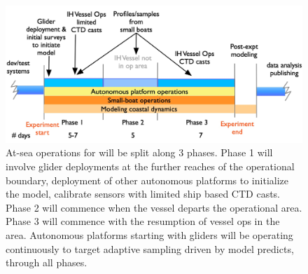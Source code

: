 \begin{figure}[!t]
  \vspace{-0.5cm}
  \centering
  \includegraphics[scale=0.25]{fig/timelines.jpg}
  \caption{At-sea operations for \proj will be split along 3 phases.
    Phase 1 will involve glider deployments at the further reaches of
    the operational boundary, deployment of other autonomous platforms
    to initialize the model, calibrate sensors with limited ship based
    CTD casts. Phase 2 will commence when the vessel departs the \naz
    operational area. Phase 3 will commence with the resumption of
    vessel ops in the \naz area. Autonomous platforms starting with
    gliders will be operating continuously to target adaptive sampling
    driven by model predicts, through all phases.}
  \vspace{-0.3cm}
 \label{fig:expt-phases}
\end{figure}

 
